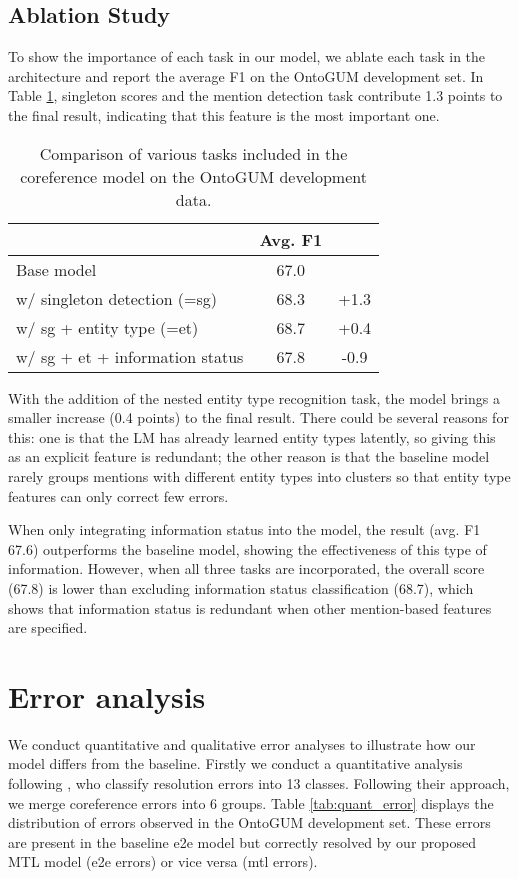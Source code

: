 \documentclass[11pt]{article}
\begin{document}
\subsection{Ablation Study}
To show the importance of each task in our model, we ablate each task in the architecture and report the average F1 on the OntoGUM development set. In Table \ref{tab:abalation}, singleton scores and the mention detection task contribute 1.3 points to the final result, indicating that this feature is the most important one.

\begin{table}[t!hb]
    \centering\small
    \begin{tabular}{p{4.5cm}cc}
    \toprule
     & Avg. F1 &  \\
    \hline
    \rule{0pt}{2ex}Base model & 67.0 & \\
    \hspace{1ex}w/ singleton detection (=sg) & 68.3 & +1.3\\
    \hspace{1ex}w/ sg + entity type (=et) & 68.7 & +0.4 \\
    \hspace{1ex}w/ sg + et + information status & 67.8 & -0.9 \\
    \bottomrule
    \end{tabular}
    \caption{Comparison of various tasks included in the coreference model on the OntoGUM development data.}
    \label{tab:abalation}
\end{table}



With the addition of the nested entity type recognition task, the model brings a smaller increase (0.4 points) to the final result. There could be several reasons for this: one is that the LM has already learned entity types latently, so giving this as an explicit feature is redundant; the other reason is that the baseline model rarely groups mentions with different entity types into clusters so that entity type features can only correct few errors.

When only integrating information status into the model, the result (avg. F1 67.6) outperforms the baseline model, showing the effectiveness of this type of information. However, when all three tasks are incorporated, the overall score (67.8) is lower than excluding information status classification (68.7), which shows that information status is redundant when other mention-based features are specified.

\section{Error analysis}
\label{sec:appendix_error}
We conduct quantitative and qualitative error analyses to illustrate how our model differs from the baseline. 
Firstly we conduct a quantitative analysis following \citet{lu-ng-2020-conundrums}, who classify resolution errors into 13 classes. Following their approach, we merge coreference errors into 6 groups. Table \ref{tab:quant_error} displays the distribution of errors observed in the OntoGUM development set. These errors are present in the baseline e2e model but correctly resolved by our proposed MTL model (e2e errors) or vice versa (mtl errors).
\end{document}
